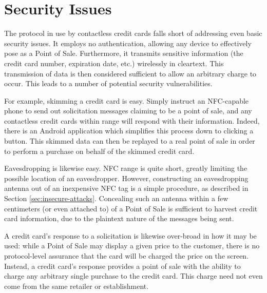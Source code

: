 \section{Security Issues}
\label{sec:intro-problem}

The protocol in use by contactless credit cards falls short of addressing even basic security issues.
It employs no authentication, allowing any device to effectively pose as a Point of Sale.
Furthermore, it transmits sensitive information (the credit card number, expiration date, etc.) wirelessly in cleartext.
This transmission of data is then considered sufficient to allow an arbitrary charge to occur.
This leads to a number of potential security vulnerabilities.

For example, skimming a credit card is easy.
Simply instruct an NFC-capable phone to send out solicitation messages claiming to be a point of sale, and any contactless credit cards within range will respond with their information.
Indeed, there is an Android application \cite{NFCProxy} which simplifies this process down to clicking a button.
This skimmed data can then be replayed to a real point of sale in order to perform a purchase on behalf of the skimmed credit card.

Eavesdropping is likewise easy.
NFC range is quite short, greatly limiting the possible location of an eavesdropper.
However, constructing an eavesdropping antenna out of an inexpensive NFC tag is a simple procedure, as described in Section \ref{sec:insecure-attacks}.
Concealing such an antenna within a few centimeters (or even attached to) of a Point of Sale is sufficient to harvest credit card information,
    due to the plaintext nature of the messages being sent.

A credit card's response to a solicitation is likewise over-broad in how it may be used:
    while a Point of Sale may display a given price to the customer, there is no protocol-level assurance that the card will be charged the price on the screen.
Instead, a credit card's response provides a point of sale with the ability to charge any arbitrary single purchase to the credit card.
This charge need not even come from the same retailer or establishment.
